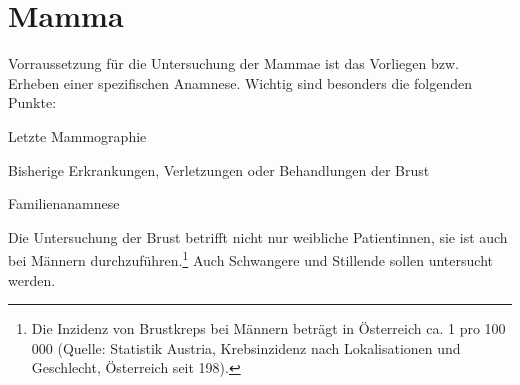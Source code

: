 \section{Mamma}

Vorraussetzung für die Untersuchung der Mammae ist das
Vorliegen bzw. Erheben einer spezifischen Anamnese. Wichtig
sind besonders die folgenden Punkte:

\begin{compactitem}
  \item Letzte Mammographie
  \item Bisherige Erkrankungen, Verletzungen
  oder Behandlungen der Brust
  \item Familienanamnese
\end{compactitem}

Die Untersuchung der Brust betrifft nicht nur weibliche
Patientinnen, sie ist auch bei Männern
durchzuführen.\footnote{Die Inzidenz von Brustkreps bei
Männern beträgt in Österreich ca. 1 pro 100\,000 (Quelle:
Statistik Austria, Krebsinzidenz 
nach Lokalisationen und Geschlecht, Österreich seit 198).}
Auch Schwangere und Stillende sollen untersucht werden. 

